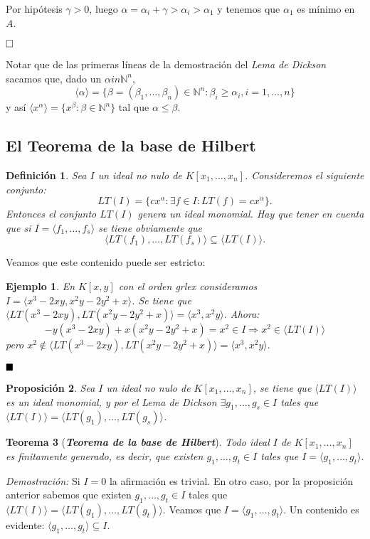 \documentclass[12pt]{article}
\newtheorem{theorem}{Teorema}[section]
\newtheorem{proposition}[theorem]{Proposición}
\newtheorem{definition}[theorem]{Definición}
\newtheorem{example}{Ejemplo}[theorem]
\begin{document}
Por hipótesis $\gamma >0$, luego $\alpha = \alpha_i + \gamma > \alpha_i >\alpha_1$ y tenemos que $\alpha_1$ es mínimo en $A$.

$\hfill \square$

Notar que de las primeras líneas de la demostración del \textit{Lema de Dickson} sacamos que, dado un $\alpha 	in \mathbb{N}^n$, $$\langle \alpha \rangle = \lbrace \beta=(\beta_1, \ldots, \beta_n) \in \mathbb{N}^n: \beta_i \geq \alpha_i, i=1, \ldots, n \rbrace$$ y así $\langle x^\alpha \rangle = \lbrace x^\beta : \beta \in \mathbb{N}^n \rbrace$ tal que $ \alpha \leq \beta$.

\subsection{El Teorema de la base de Hilbert}

\begin{definition}Sea $I$ un ideal no nulo de $K[x_1, \ldots, x_n]$. Consideremos el siguiente conjunto: $$LT(I) = \lbrace cx^\alpha : \exists f \in I: LT(f) = cx^\alpha \rbrace.$$ Entonces el conjunto $LT(I)$ genera un ideal monomial. Hay que tener en cuenta que si $I = \langle f_1, \ldots, f_s \rangle$ se tiene obviamente que $$\langle LT(f_1), \ldots, LT(f_s) \rangle \subseteq \langle LT(I) \rangle.$$
\end{definition}

Veamos que este contenido puede ser estricto:

\begin{example}En $K[x,y]$ con el orden grlex consideramos $I = \langle x^3-2xy,x^2y-2y^2+x \rangle$. Se tiene que $\langle LT(x^3-2xy), LT(x^2y-2y^2+x) \rangle = \langle x^3, x^2y \rangle.$ Ahora: $$-y(x^3-2xy) +x(x^2y-2y^2+x) = x^2 \in I \Longrightarrow x^2 \in \langle LT(I) \rangle$$ pero $ x^2 \notin \langle LT(x^3-2xy), LT(x^2y-2y^2+x) \rangle = \langle x^3, x^2y \rangle.$
\end{example}
$\hfill \blacksquare$

\begin{proposition}Sea $I$ un ideal no nulo de $K[x_1, \ldots, x_n]$, se tiene que $\langle LT(I) \rangle$ es un ideal monomial, y por el \textit{Lema de Dickson} $\exists g_1, \ldots, g_s \in I$ tales que $\langle LT(I) \rangle = \langle LT(g_1), \ldots, LT(g_s) \rangle$.
\end{proposition}

\begin{theorem}[\textbf{\textit{Teorema de la base de Hilbert}}]
Todo ideal $I$ de $K[x_1, \ldots, x_n]$ es finitamente generado, es decir, que existen $g_1, \ldots, g_t \in I$ tales que $I = \langle g_1, \ldots, g_t \rangle.$
\end{theorem}
\emph{Demostración: }Si $I = 0$ la afirmación es trivial. En otro caso, por la proposición anterior sabemos que existen $g_1, \ldots, g_t \in I$ tales que $\langle LT(I) \rangle = \langle LT(g_1), \ldots, LT(g_t) \rangle.$ Veamos que $I = \langle g_1, \ldots, g_t \rangle$. Un contenido es evidente: $\langle g_1, \ldots, g_t \rangle \subseteq I$.
\end{document}
